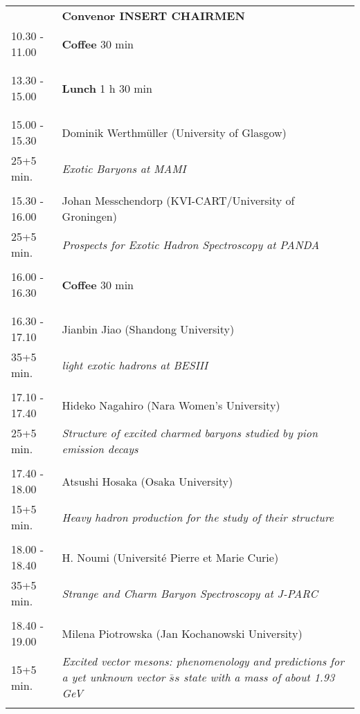 \begin{longtable}{p{3cm}p{13cm}}
&\hfill {\bf Convenor INSERT CHAIRMEN }\\ 
10.30 - 11.00 & {\bf Coffee} \hfill 30 min \\ 
 & \\ 
 & \\ 
13.30 - 15.00 & {\bf Lunch} \hfill 1 h 30 min \\ 
 & \\ 
 & \\ 
15.00 - 15.30 & Dominik Werthmüller (University of Glasgow)\\ 
25+5 min. & {\it Exotic Baryons at MAMI}\\ 
 & \\ 
15.30 - 16.00 & Johan Messchendorp (KVI-CART/University of Groningen)\\ 
25+5 min. & {\it Prospects for Exotic Hadron Spectroscopy at PANDA}\\ 
 & \\ 
16.00 - 16.30 & {\bf Coffee} \hfill 30 min \\ 
 & \\ 
 & \\ 
16.30 - 17.10 & Jianbin Jiao (Shandong University)\\ 
35+5 min. & {\it light exotic hadrons at BESIII}\\ 
 & \\ 
17.10 - 17.40 & Hideko Nagahiro (Nara Women's University)\\ 
25+5 min. & {\it Structure of excited charmed baryons studied by pion emission decays}\\ 
 & \\ 
17.40 - 18.00 & Atsushi Hosaka (Osaka University)\\ 
15+5 min. & {\it Heavy hadron production for the study of their structure}\\ 
 & \\ 
18.00 - 18.40 & H. Noumi (Université Pierre et Marie Curie)\\ 
35+5 min. & {\it Strange and Charm Baryon Spectroscopy at J-PARC}\\ 
 & \\ 
18.40 - 19.00 & Milena Piotrowska (Jan Kochanowski University)\\ 
15+5 min. & {\it Excited vector mesons: phenomenology and predictions for a yet unknown vector $\bar{s}s$ state with a mass of about 1.93 GeV}\\ 
 & \\ 
\end{longtable}

